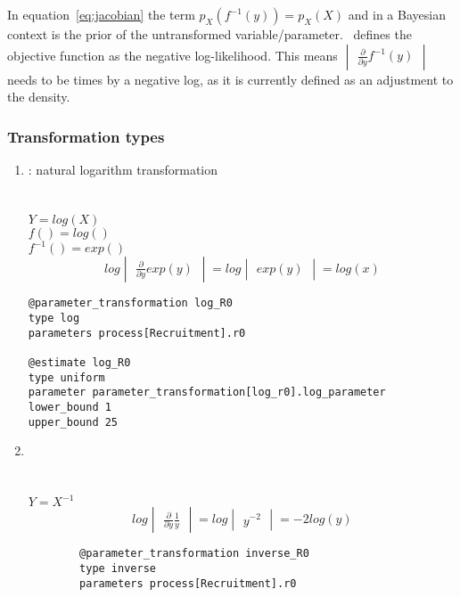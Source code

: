 In equation~\ref{eq:jacobian} the term $p_X(f^{-1}(y)) = p_X(X)$ and in a Bayesian context is the prior of the untransformed variable/parameter. \CNAME\ defines the objective function as the negative log-likelihood. This means \(\begin{vmatrix} \frac{\partial}{\partial y} f^{-1}(y) \end{vmatrix}\) needs to be times by a negative log, as it is currently defined as an adjustment to the density.

\subsubsection{Transformation types}\label{subsec:Transformation-types}
\begin{enumerate}
\item {}  : natural logarithm transformation\\
\\
\\
$Y = log(X)$\\
$f() = log()$\\
$f^{-1}() = exp()$
\[
log \begin{vmatrix} \frac{\partial}{\partial y}  exp (y) \end{vmatrix} = log \begin{vmatrix}  exp (y) \end{vmatrix} = log(x)
\]
\label{sec:Transformation-Log}
{\small{\begin{verbatim}
@parameter_transformation log_R0
type log
parameters process[Recruitment].r0

@estimate log_R0
type uniform
parameter parameter_transformation[log_r0].log_parameter
lower_bound 1
upper_bound 25
\end{verbatim}}}

\item {}\\
\\
\\
$Y = X^{-1}$
\[
log \begin{vmatrix} \frac{\partial}{\partial y} \frac{1}{y} \end{vmatrix} = log \begin{vmatrix} y^{-2}\end{vmatrix} = -2log(y)
\]
\label{sec:Transformation-Inverse}
{\small{\begin{verbatim}
		@parameter_transformation inverse_R0
		type inverse
		parameters process[Recruitment].r0
		

\end{verbatim}}}
\end{enumerate}
